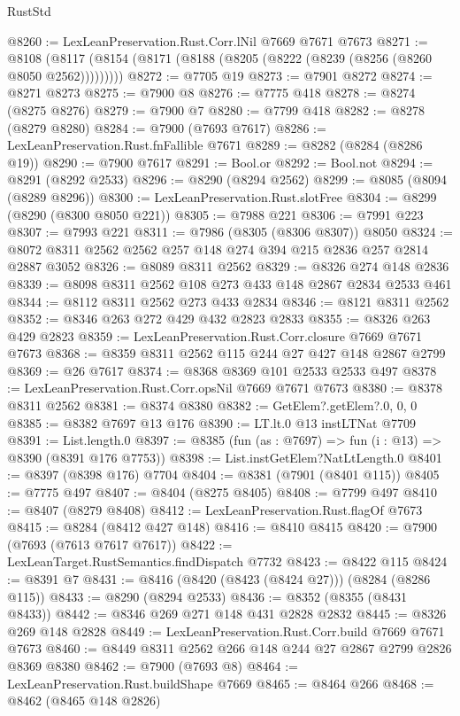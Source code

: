 \begin{lexlean}{RustStd}
\begin{coremodule}
@8260 := LexLeanPreservation.Rust.Corr.lNil @7669 @7671 @7673
@8271 := @8108 (@8117 (@8154 (@8171 (@8188 (@8205 (@8222 (@8239 (@8256 (@8260 @8050 @2562)))))))))
@8272 := @7705 @19
@8273 := @7901 @8272
@8274 := @8271 @8273
@8275 := @7900 @8
@8276 := @7775 @418
@8278 := @8274 (@8275 @8276)
@8279 := @7900 @7
@8280 := @7799 @418
@8282 := @8278 (@8279 @8280)
@8284 := @7900 (@7693 @7617)
@8286 := LexLeanPreservation.Rust.fnFallible @7671
@8289 := @8282 (@8284 (@8286 @19))
@8290 := @7900 @7617
@8291 := Bool.or
@8292 := Bool.not
@8294 := @8291 (@8292 @2533)
@8296 := @8290 (@8294 @2562)
@8299 := @8085 (@8094 (@8289 @8296))
@8300 := LexLeanPreservation.Rust.slotFree
@8304 := @8299 (@8290 (@8300 @8050 @221))
@8305 := @7988 @221
@8306 := @7991 @223
@8307 := @7993 @221
@8311 := @7986 (@8305 (@8306 @8307)) @8050
@8324 := @8072 @8311 @2562 @2562 @257 @148 @274 @394 @215 @2836 @257 @2814 @2887 @3052
@8326 := @8089 @8311 @2562
@8329 := @8326 @274 @148 @2836
@8339 := @8098 @8311 @2562 @108 @273 @433 @148 @2867 @2834 @2533 @461
@8344 := @8112 @8311 @2562 @273 @433 @2834
@8346 := @8121 @8311 @2562
@8352 := @8346 @263 @272 @429 @432 @2823 @2833
@8355 := @8326 @263 @429 @2823
@8359 := LexLeanPreservation.Rust.Corr.closure @7669 @7671 @7673
@8368 := @8359 @8311 @2562 @115 @244 @27 @427 @148 @2867 @2799
@8369 := @26 @7617
@8374 := @8368 @8369 @101 @2533 @2533 @497
@8378 := LexLeanPreservation.Rust.Corr.opsNil @7669 @7671 @7673
@8380 := @8378 @8311 @2562
@8381 := @8374 @8380
@8382 := GetElem?.getElem?.{0, 0, 0}
@8385 := @8382 @7697 @13 @176
@8390 := LT.lt.{0} @13 instLTNat @7709
@8391 := List.length.{0}
@8397 := @8385 (fun (as : @7697) => fun (i : @13) => @8390 (@8391 @176 @7753))
@8398 := List.instGetElem?NatLtLength.{0}
@8401 := @8397 (@8398 @176) @7704
@8404 := @8381 (@7901 (@8401 @115))
@8405 := @7775 @497
@8407 := @8404 (@8275 @8405)
@8408 := @7799 @497
@8410 := @8407 (@8279 @8408)
@8412 := LexLeanPreservation.Rust.flagOf @7673
@8415 := @8284 (@8412 @427 @148)
@8416 := @8410 @8415
@8420 := @7900 (@7693 (@7613 @7617 @7617))
@8422 := LexLeanTarget.RustSemantics.findDispatch @7732
@8423 := @8422 @115
@8424 := @8391 @7
@8431 := @8416 (@8420 (@8423 (@8424 @27))) (@8284 (@8286 @115))
@8433 := @8290 (@8294 @2533)
@8436 := @8352 (@8355 (@8431 @8433))
@8442 := @8346 @269 @271 @148 @431 @2828 @2832
@8445 := @8326 @269 @148 @2828
@8449 := LexLeanPreservation.Rust.Corr.build @7669 @7671 @7673
@8460 := @8449 @8311 @2562 @266 @148 @244 @27 @2867 @2799 @2826 @8369 @8380
@8462 := @7900 (@7693 @8)
@8464 := LexLeanPreservation.Rust.buildShape @7669
@8465 := @8464 @266
@8468 := @8462 (@8465 @148 @2826)

\end{coremodule}
\end{lexlean}
